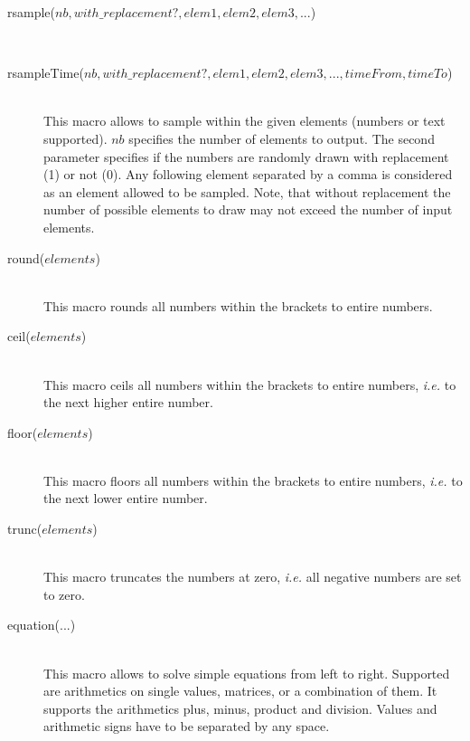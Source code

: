 \documentclass[letterpaper,12pt,oneside]{book}
\begin{document}
\begin{description}
\item[rsample($nb, with\_replacement?, elem1, elem2, elem3, ...$)]\hspace*{\fill}\\
\vspace{-9mm}
\item[rsampleTime($nb, with\_replacement?, elem1, elem2, elem3, ..., timeFrom, timeTo$)]\hspace*{\fill}\\
This macro allows to sample within the given elements (numbers or text supported). $nb$ specifies the number of elements to output. The second parameter specifies if the numbers are randomly drawn with replacement (1) or not (0). Any following element separated by a comma  is considered as an element allowed to be sampled. Note, that without replacement the number of possible elements to draw may not exceed the number of input elements.

\item[round($elements$)]\hspace*{\fill}\\
This macro rounds all numbers within the brackets to entire numbers.

\item[ceil($elements$)]\hspace*{\fill}\\
This macro ceils all numbers within the brackets to entire numbers, \textit{i.e.} to the next higher entire number.

\item[floor($elements$)]\hspace*{\fill}\\
This macro floors all numbers within the brackets to entire numbers, \textit{i.e.} to the next lower entire number.

\item[trunc($elements$)]\hspace*{\fill}\\
This macro truncates the numbers at zero, \textit{i.e.} all negative numbers are set to zero.

\item[equation($...$)]\hspace*{\fill}\\
This macro allows to solve simple equations from left to right. Supported are arithmetics on single values, matrices, or a combination of them. It supports the arithmetics plus, minus, product and division. Values and arithmetic signs have to be separated by any space.

\end{description}
\end{document}
